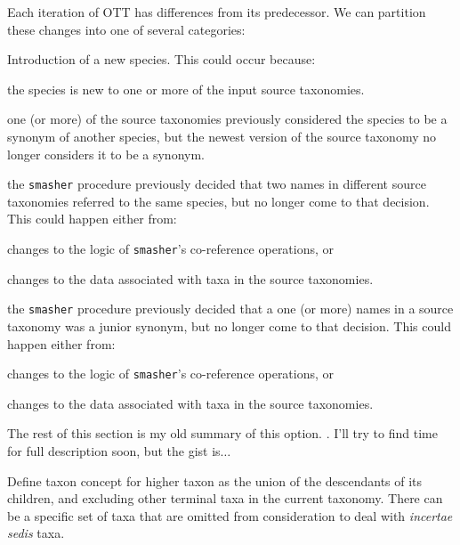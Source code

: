 \documentclass[11pt]{article}
\newcommand{\mthcomment}[1]{{\color{red} #1}\xspace}
\begin{document}
Each iteration of OTT has differences from its predecessor.
We can partition these changes into one of several categories:
\begin{compactenum}
  \item Introduction of a new species. This could occur because:
  \begin{compactenum}
    \item the species is new to one or more of the input source taxonomies.
    \item one (or more) of the source taxonomies previously considered the species to be
      a synonym of another species, but the newest version of the source taxonomy no longer
      considers it to be a synonym.
    \item the {\tt smasher} procedure previously decided that two names in different source
      taxonomies referred to the same species, but no longer come to that decision. 
      This could happen either from:
      \begin{compactenum}
        \item changes to the logic of {\tt smasher}'s co-reference operations, or
        \item changes to the data associated with taxa in the source taxonomies.
      \end{compactenum}
    \item the {\tt smasher} procedure previously decided that a one (or more)
      names in a source taxonomy was a junior synonym, but no longer come to that decision. 
      This could happen either from:
      \begin{compactenum}
        \item changes to the logic of {\tt smasher}'s co-reference operations, or
        \item changes to the data associated with taxa in the source taxonomies.
      \end{compactenum}
  \end{compactenum}
\end{compactenum}

\mthcomment{The rest of this section is my old summary
of this option. . I'll try to find time for full description soon, but
the gist is$\ldots$}

Define taxon concept for higher taxon as the union of the descendants of its children, and excluding other terminal taxa in the current taxonomy.
There can be a specific set of taxa that are omitted from consideration to deal with 
{\em incertae sedis} taxa.
\end{document}
